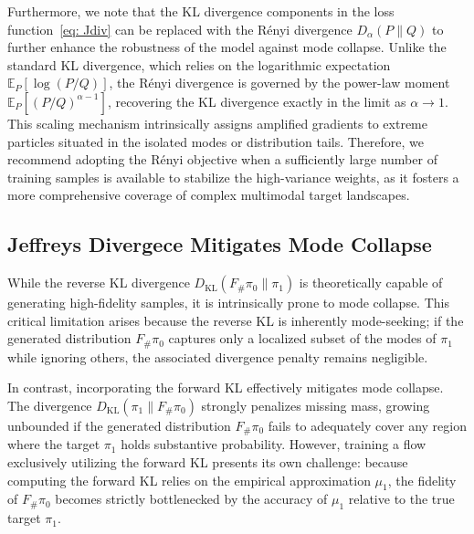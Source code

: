 \documentclass[%
 reprint,
 amsmath,amssymb,
 aps,
 pre,
]{revtex4-2}
\DeclareMathOperator{\KL}{KL}
\begin{document}
Furthermore, we note that the KL divergence components in the loss function~\eqref{eq: Jdiv} can be replaced with the Rényi divergence $D_\alpha(P\|Q)$ to further enhance the robustness of the model against mode collapse. Unlike the standard KL divergence, which relies on the logarithmic expectation $\mathbb E_P[\log(P/Q)]$, the Rényi divergence is governed by the power-law moment $\mathbb E_P[(P/Q)^{\alpha-1}]$, recovering the KL divergence exactly in the limit as $\alpha \to 1$. This scaling mechanism intrinsically assigns amplified gradients to extreme particles situated in the isolated modes or distribution tails. Therefore, we recommend adopting the Rényi objective when a sufficiently large number of training samples is available to stabilize the high-variance weights, as it fosters a more comprehensive coverage of complex multimodal target landscapes.

\subsection{Jeffreys Divergece Mitigates Mode Collapse}

While the reverse KL divergence $D_{\KL}(F_\#\pi_0\|\pi_1)$ is theoretically capable of generating high-fidelity samples, it is intrinsically prone to mode collapse. This critical limitation arises because the reverse KL is inherently mode-seeking; if the generated distribution $F_\#\pi_0$ captures only a localized subset of the modes of $\pi_1$ while ignoring others, the associated divergence penalty remains negligible.

In contrast, incorporating the forward KL effectively mitigates mode collapse. The divergence $D_{\KL}(\pi_1\|F_\#\pi_0)$ strongly penalizes missing mass, growing unbounded if the generated distribution $F_\#\pi_0$ fails to adequately cover any region where the target $\pi_1$ holds substantive probability. However, training a flow exclusively utilizing the forward KL presents its own challenge: because computing the forward KL relies on the empirical approximation $\mu_1$, the fidelity of $F_\#\pi_0$ becomes strictly bottlenecked by the accuracy of $\mu_1$ relative to the true target $\pi_1$.
\end{document}
